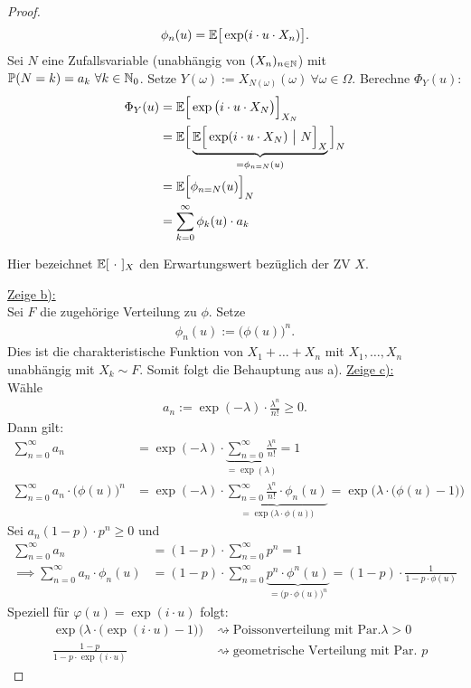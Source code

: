 \begin{proof}
	\begin{align*}
		\phi_n(u)=\mathbb{E}\big[\exp(i\cdot u\cdot X_n)\big].
	\end{align*}
	Sei $N$ eine Zufallsvariable (unabhängig von $(X_n)_{n\in\mathbb{N}}$) mit $\mathbb{P}(N=k)=a_k~\forall k\in\mathbb{N}_0$.
	Setze $Y(\omega):=X_{N(\omega)}(\omega)~\forall\omega\in\Omega$.
	Berechne $\Phi_Y(u)$:
	\begin{align*}
		\Phi_Y(u)
		&=\mathbb{E}\Big[\exp\big(i\cdot u\cdot X_N\big)\Big]_{X_N}\\
		&=\mathbb{E}\Big[\underbrace{\mathbb{E}\Big[\exp(i\cdot u\cdot X_N)~\big|~N\Big]_X}_{=\phi_{n=N}(u)}\Big]_N\\
		&=\mathbb{E}\Big[\phi_{n=N}(u)\Big]_N\\
		&=\sum\limits_{k=0}^\infty\phi_k(u)\cdot a_k
	\end{align*}

	Hier bezeichnet $\mathbb{E}[~\cdot~]_X$ den Erwartungswert bezüglich der ZV $X$.
	
	\underline{Zeige b):}\\
	Sei $F$ die zugehörige Verteilung zu $\phi$.
	Setze
	\begin{align*}
		\phi_n(u):=\big(\phi(u)\big)^n.
	\end{align*}
	Dies ist die charakteristische Funktion von $X_1+\ldots+X_n$ mit $X_1,\ldots,X_n$ unabhängig mit $X_k\sim F$.
	Somit folgt die Behauptung aus a).\nl
	\underline{Zeige c):}\\
	Wähle
	\begin{align*}
		a_n:=\exp(-\lambda)\cdot\frac{\lambda^n}{n!}\geq0.
	\end{align*}
	Dann gilt:
	\begin{align*}
		\sum\limits_{n=0}^\infty a_n
		&=\exp(-\lambda)\cdot\underbrace{\sum\limits_{n=0}^\infty\frac{\lambda^n}{n!}}_{=\exp(\lambda)}=1\\
		\sum\limits_{n=0}^\infty a_n\cdot\big(\phi(u)\big)^n
		&=\exp(-\lambda)\cdot\underbrace{\sum\limits_{n=0}^\infty\frac{\lambda^n}{n!}\cdot\phi_n(u)}_{=\exp\big(\lambda\cdot\phi(u)\big)}
		=\exp\Big(\lambda\cdot\big(\phi(u)-1\big)\Big)
	\end{align*}
	Sei $a_n(1-p)\cdot p^n\geq0$ und 
	\begin{align*}
		\sum\limits_{n=0}^\infty a_n&=(1-p)\cdot\sum\limits_{n=0}^\infty p^n=1\\
		\implies
		\sum\limits_{n=0}^\infty a_n\cdot\phi_n(u)
		&=(1-p)\cdot\sum\limits_{n=0}^\infty\underbrace{p^n\cdot\phi^n(u)}_{=\big(p\cdot\phi(u)\big)^n}
		=(1-p)\cdot\frac{1}{1-p\cdot\phi(u)}
	\end{align*}		
	Speziell für $\varphi(u)=\exp(i\cdot u)$ folgt:
	\begin{align*}
		&\exp\Big(\lambda\cdot\big(\exp(i\cdot u)-1\big)\Big) &\rightsquigarrow\text{Poissonverteilung mit Par.}\lambda>0\\
		&\frac{1-p}{1-p\cdot\exp(i\cdot u)}	&\rightsquigarrow\text{geometrische Verteilung mit Par. }p
	\end{align*}
\end{proof}

